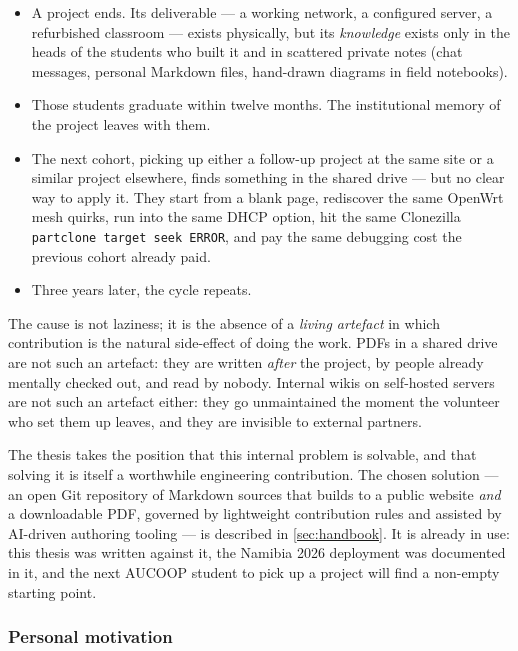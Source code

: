 \begin{itemize}
\tightlist
\item
  A project ends. Its deliverable --- a working network, a configured
  server, a refurbished classroom --- exists physically, but its
  \emph{knowledge} exists only in the heads of the students who built it
  and in scattered private notes (chat messages, personal Markdown
  files, hand-drawn diagrams in field notebooks).
\item
  Those students graduate within twelve months. The institutional memory
  of the project leaves with them.
\item
  The next cohort, picking up either a follow-up project at the same
  site or a similar project elsewhere, finds something in the shared
  drive --- but no clear way to apply it. They start from a blank page,
  rediscover the same OpenWrt mesh quirks, run into the same DHCP
  option, hit the same Clonezilla
  \texttt{partclone\ target\ seek\ ERROR}, and pay the same debugging
  cost the previous cohort already paid.
\item
  Three years later, the cycle repeats.
\end{itemize}

The cause is not laziness; it is the absence of a \emph{living artefact}
in which contribution is the natural side-effect of doing the work. PDFs
in a shared drive are not such an artefact: they are written
\emph{after} the project, by people already mentally checked out, and
read by nobody. Internal wikis on self-hosted servers are not such an
artefact either: they go unmaintained the moment the volunteer who set
them up leaves, and they are invisible to external partners.

The thesis takes the position that this internal problem is solvable,
and that solving it is itself a worthwhile engineering contribution. The
chosen solution --- an open Git repository of Markdown sources that
builds to a public website \emph{and} a downloadable PDF, governed by
lightweight contribution rules and assisted by AI-driven authoring
tooling --- is described in \autoref{sec:handbook}. It is already in
use: this thesis was written against it, the Namibia 2026 deployment was
documented in it, and the next AUCOOP student to pick up a project will
find a non-empty starting point.

\hypertarget{personal-motivation}{%
\subsubsection{Personal motivation}\label{personal-motivation}}

